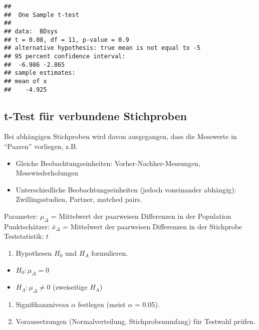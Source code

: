 \documentclass[
]{book}
\providecommand{\tightlist}{%
  \setlength{\itemsep}{0pt}\setlength{\parskip}{0pt}}
\begin{document}
\begin{verbatim}
## 
##  One Sample t-test
## 
## data:  BDsys
## t = 0.08, df = 11, p-value = 0.9
## alternative hypothesis: true mean is not equal to -5
## 95 percent confidence interval:
##  -6.986 -2.865
## sample estimates:
## mean of x 
##    -4.925
\end{verbatim}

\hypertarget{t-test-fuxfcr-verbundene-stichproben}{%
\subsection{t-Test für verbundene Stichproben}\label{t-test-fuxfcr-verbundene-stichproben}}

Bei abhängigen Stichproben wird davon ausgegangen, dass die Messwerte in ``Paaren'' vorliegen, z.B.

\begin{itemize}
\tightlist
\item
  Gleiche Beobachtungseinheiten: Vorher-Nachher-Messungen, Messwiederholungen\\
\item
  Unterschiedliche Beobachtungseinheiten (jedoch voneinander abhängig): Zwillingsstudien, Partner, matched pairs.
\end{itemize}

Parameter: \(\mu_{\Delta}\) = Mittelwert der paarweisen Differenzen in der Population\\
Punktschätzer: \(\bar{x}_{\Delta}\) = Mittelwert der paarweisen Differenzen in der Stichprobe\\
Teststatistik: \(t\)

\begin{enumerate}
\def\labelenumi{\arabic{enumi}.}
\tightlist
\item
  Hypothesen \(H_0\) und \(H_A\) formulieren.
\end{enumerate}

\begin{itemize}
\tightlist
\item
  \(H_0: \mu_{\Delta} = 0\)\\
\item
  \(H_A: \mu_{\Delta} \neq 0\) (zweiseitige \(H_A\))
\end{itemize}

\begin{enumerate}
\def\labelenumi{\arabic{enumi}.}
\setcounter{enumi}{1}
\item
  Signifikanzniveau \(\alpha\) festlegen (meist \(\alpha\) = 0.05).
\item
  Voraussetzungen (Normalverteilung, Stichprobenumfang) für Testwahl prüfen.
\end{enumerate}
\end{document}
